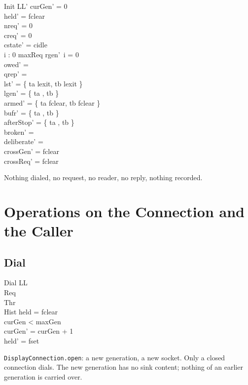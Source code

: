 \documentclass[a4paper,10pt,fleqn]{article}
\begin{document}
\begin{schema}{Init}
  LL'
\where
  curGen' = 0 \\
  held' = fclear \\
  nreq' = 0 \\
  creq' = 0 \\
  cstate' = cidle \\
  \forall i : 0 \upto maxReq \spot rgen'~i = 0 \\
  owed' = \emptyset \\
  qrep' = \emptyset \\
  lst' = \{ ta \mapsto lexit, tb \mapsto lexit \} \\
  lgen' = \{ ta , tb  \} \\
  armed' = \{ ta \mapsto fclear, tb \mapsto fclear \} \\
  bufr' = \{ ta \mapsto \emptyset, tb \mapsto \emptyset \} \\
  afterStop' = \{ ta , tb  \} \\
  broken' = \emptyset \\
  deliberate' = \emptyset \\
  crossGen' = fclear \\
  crossReq' = fclear
\end{schema}


Nothing dialed, no request, no reader, no reply, nothing recorded.

\section{Operations on the Connection and the Caller}


\subsection{Dial}

\begin{schema}{Dial}
  \Delta LL \\
  \Xi Req \\
  \Xi Thr \\
  \Xi Hist
\where
  held = fclear \\
  curGen < maxGen \\
  curGen' = curGen + 1 \\
  held' = fset
\end{schema}
\texttt{DisplayConnection.open}: a new generation, a new socket.  Only a
closed connection dials.  The new generation has no sink content; nothing of
an earlier generation is carried over.
\end{document}
